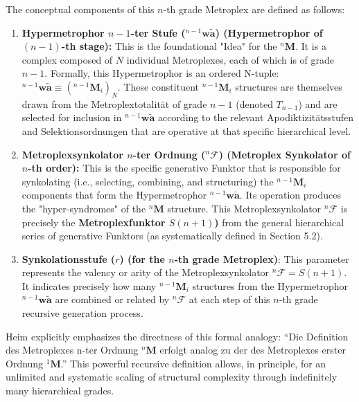\documentclass[12pt]{article}
\newcommand{\q}[1]{\enquote{#1}}
\newcommand{\metroplex}[1]{{}^{#1}\mathbf{M}}
\newcommand{\hypersyntrix}{\metroplex{1}}
\newcommand{\hypermetrophor}[1]{{}^{#1}\mathbf{w\widetilde{a}}}
\newcommand{\metroplexsynkolator}[1]{{}^{#1}\mathcal{F}}
\newcommand{\metroplextotalitaet}[1]{T_{#1}}
\newcommand{\metroplexfunktor}{S}
\begin{document}
\begin{itemize}
    The conceptual components of this \(n\)-th grade Metroplex are defined as follows:
    \begin{enumerate}
        \item \textbf{Hypermetrophor \( n-1 \)-ter Stufe (\( \hypermetrophor{n-1} \)) (Hypermetrophor of \( (n-1) \)-th stage):} This is the foundational "Idea" for the \( \metroplex{n} \). It is a complex composed of \( N \) individual Metroplexes, each of which is of grade \( n-1 \). Formally, this Hypermetrophor is an ordered N-tuple: \( \hypermetrophor{n-1} \equiv (\metroplex{n-1}_i)_N \). These constituent \( \metroplex{n-1}_i \) structures are themselves drawn from the Metroplextotalität of grade \( n-1 \) (denoted \( \metroplextotalitaet{n-1} \)) and are selected for inclusion in \( \hypermetrophor{n-1} \) according to the relevant Apodiktizitätsstufen and Selektionsordnungen that are operative at that specific hierarchical level.
        \item \textbf{Metroplexsynkolator \( n \)-ter Ordnung (\( \metroplexsynkolator{n} \)) (Metroplex Synkolator of \( n \)-th order):} This is the specific generative Funktor that is responsible for synkolating (i.e., selecting, combining, and structuring) the \( \metroplex{n-1}_i \) components that form the Hypermetrophor \( \hypermetrophor{n-1} \). Its operation produces the "hyper-syndromes" of the \( \metroplex{n} \) structure. This Metroplexsynkolator \( \metroplexsynkolator{n} \) is precisely the \textbf{Metroplexfunktor \( \metroplexfunktor(n+1) \))} from the general hierarchical series of generative Funktors (as systematically defined in Section 5.2).
        \item \textbf{Synkolationsstufe (\( r \)) (for the \(n\)-th grade Metroplex)}: This parameter represents the valency or arity of the Metroplexsynkolator \( \metroplexsynkolator{n} = \metroplexfunktor(n+1) \). It indicates precisely how many \( \metroplex{n-1}_i \) structures from the Hypermetrophor \( \hypermetrophor{n-1} \) are combined or related by \( \metroplexsynkolator{n} \) at each step of this \( n \)-th grade recursive generation process.
    \end{enumerate}
    Heim explicitly emphasizes the directness of this formal analogy: \q{Die Definition des Metroplexes n-ter Ordnung \( \metroplex{n} \) erfolgt analog zu der des Metroplexes erster Ordnung \( \hypersyntrix \).} This powerful recursive definition allows, in principle, for an unlimited and systematic scaling of structural complexity through indefinitely many hierarchical grades.


\end{itemize}
\end{document}
